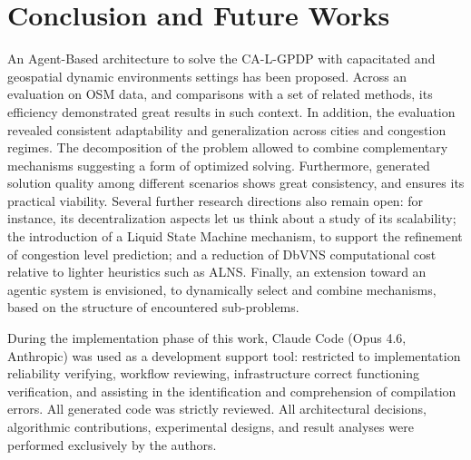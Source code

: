 \documentclass[sigconf]{acmart}
\begin{document}
\section{Conclusion and Future Works}
 
An Agent-Based architecture to solve the CA-L-GPDP with capacitated and geospatial dynamic environments settings has been proposed. Across an evaluation on OSM data, and comparisons with a set of related methods, its efficiency demonstrated great results in such context. In addition, the evaluation revealed consistent adaptability and generalization across cities and congestion regimes. The decomposition of the problem allowed to combine complementary mechanisms suggesting a form of optimized solving. Furthermore, generated solution quality among different scenarios shows great consistency, and ensures its practical viability. Several further research directions also remain open: for instance, its decentralization aspects let us think about a study of its scalability; the introduction of a Liquid State Machine mechanism, to support the refinement of congestion level prediction; and a reduction of DbVNS computational cost relative to lighter heuristics such as ALNS. Finally, an extension toward an agentic system is envisioned, to dynamically select and combine mechanisms, based on the structure of encountered sub-problems.

\begin{acks}
During the implementation phase of this work, Claude Code (Opus 4.6, Anthropic) was used as a development support tool: restricted to implementation reliability verifying, workflow reviewing, infrastructure correct functioning verification, and assisting in the identification and comprehension of compilation errors. All generated code was strictly reviewed. All architectural decisions, algorithmic contributions, experimental designs, and result analyses were performed exclusively by the authors.
\end{acks}



\end{document}
